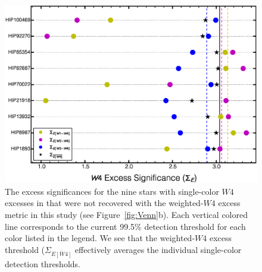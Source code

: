 \begin{figure}
\centering
\includegraphics[scale=0.5]{Ch4/Unrecovered_10}
\caption{The excess significances for the nine stars with single-color $W4$ excesses in  that were not recovered with the weighted-$W4$ excess metric in this study (see Figure~\ref{fig:Venn}b). Each vertical colored line corresponds to the current 99.5\% detection threshold for each color listed in the legend. We see that the weighted-$W4$ excess threshold ($\Sigma_{\overline{E[W4]}}$ effectively averages the individual single-color detection thresholds.}
\label{fig:unrecovered_10}
\end{figure}

